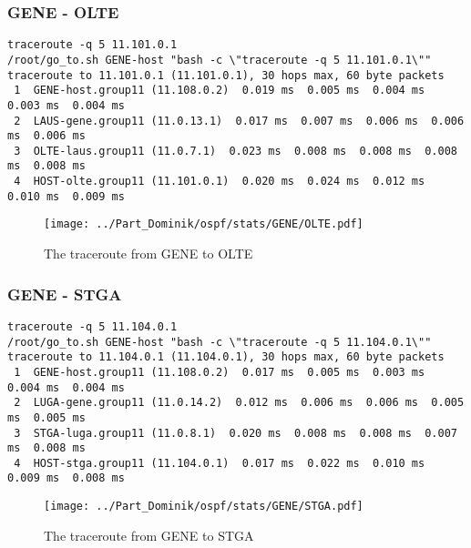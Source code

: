 \subsubsection{GENE - OLTE}
\begin{lstlisting}
traceroute -q 5 11.101.0.1
/root/go_to.sh GENE-host "bash -c \"traceroute -q 5 11.101.0.1\""
traceroute to 11.101.0.1 (11.101.0.1), 30 hops max, 60 byte packets
 1  GENE-host.group11 (11.108.0.2)  0.019 ms  0.005 ms  0.004 ms  0.003 ms  0.004 ms
 2  LAUS-gene.group11 (11.0.13.1)  0.017 ms  0.007 ms  0.006 ms  0.006 ms  0.006 ms
 3  OLTE-laus.group11 (11.0.7.1)  0.023 ms  0.008 ms  0.008 ms  0.008 ms  0.008 ms
 4  HOST-olte.group11 (11.101.0.1)  0.020 ms  0.024 ms  0.012 ms  0.010 ms  0.009 ms
\end{lstlisting}
\begin{figure}[H]
\centering
\texttt{[image: ../Part\_Dominik/ospf/stats/GENE/OLTE.pdf]}
\caption{The traceroute from GENE to OLTE}
\end{figure}
\clearpage
\subsubsection{GENE - STGA}
\begin{lstlisting}
traceroute -q 5 11.104.0.1
/root/go_to.sh GENE-host "bash -c \"traceroute -q 5 11.104.0.1\""
traceroute to 11.104.0.1 (11.104.0.1), 30 hops max, 60 byte packets
 1  GENE-host.group11 (11.108.0.2)  0.017 ms  0.005 ms  0.003 ms  0.004 ms  0.004 ms
 2  LUGA-gene.group11 (11.0.14.2)  0.012 ms  0.006 ms  0.006 ms  0.005 ms  0.005 ms
 3  STGA-luga.group11 (11.0.8.1)  0.020 ms  0.008 ms  0.008 ms  0.007 ms  0.008 ms
 4  HOST-stga.group11 (11.104.0.1)  0.017 ms  0.022 ms  0.010 ms  0.009 ms  0.008 ms
\end{lstlisting}
\begin{figure}[H]
\centering
\texttt{[image: ../Part\_Dominik/ospf/stats/GENE/STGA.pdf]}
\caption{The traceroute from GENE to STGA}
\end{figure}
\clearpage
